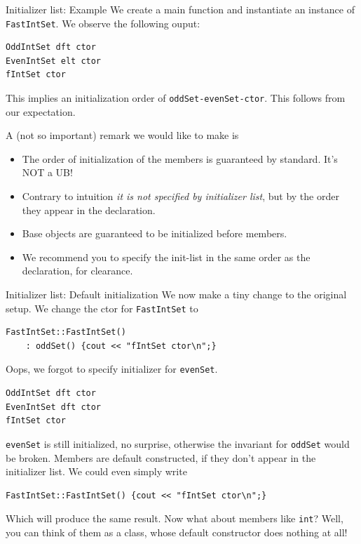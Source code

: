 \begin{frame}[fragile]{Initializer list: Example}
We create a main function and instantiate an instance of \texttt{FastIntSet}. We observe the following ouput:
\begin{verbatim}
OddIntSet dft ctor
EvenIntSet elt ctor
fIntSet ctor
\end{verbatim}
This implies an initialization order of \texttt{oddSet-evenSet-ctor}. This follows from our expectation. 

\vspace{0.1in}
A (not so important) remark we would like to make is
\begin{itemize}
	\item The order of initialization of the members is guaranteed by standard. It's NOT a UB!
	\item Contrary to intuition \textit{it is not specified by initializer list}, but by the order they appear in the declaration.
	\item Base objects are guaranteed to be initialized before members.
	\item We recommend you to specify the init-list in the same order as the declaration, for clearance.
\end{itemize}
\end{frame}

\begin{frame}[fragile]{Initializer list: Default initialization}
We now make a tiny change to the original setup. We change the ctor for \texttt{FastIntSet} to 
\begin{verbatim}
FastIntSet::FastIntSet() 
    : oddSet() {cout << "fIntSet ctor\n";}
\end{verbatim}

Oops, we forgot to specify initializer for \texttt{evenSet}.

\begin{verbatim}
OddIntSet dft ctor
EvenIntSet dft ctor
fIntSet ctor
\end{verbatim}

\texttt{evenSet} is still initialized, no surprise, otherwise the invariant for \texttt{oddSet} would be broken. Members are default constructed, if they don't appear in the initializer list. We could even simply write 

\begin{verbatim}
FastIntSet::FastIntSet() {cout << "fIntSet ctor\n";}
\end{verbatim}

Which will produce the same result. Now what about members like \texttt{int}? Well, you can think of them as a class, whose default constructor does nothing at all!
\end{frame}

